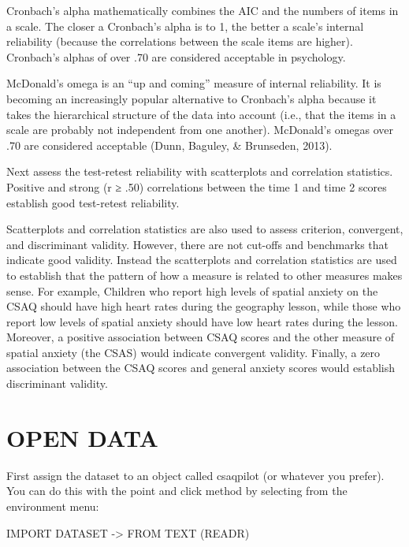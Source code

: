\documentclass[
]{book}
\begin{document}
Cronbach's alpha mathematically combines the AIC and the numbers of items in a scale. The closer a Cronbach's alpha is to 1, the better a scale's internal reliability (because the correlations between the scale items are higher). Cronbach's alphas of over .70 are considered acceptable in psychology.

McDonald's omega is an ``up and coming'' measure of internal reliability. It is becoming an increasingly popular alternative to Cronbach's alpha because it takes the hierarchical structure of the data into account (i.e., that the items in a scale are probably not independent from one another). McDonald's omegas over .70 are considered acceptable (Dunn, Baguley, \& Brunseden, 2013).

Next assess the test-retest reliability with scatterplots and correlation statistics. Positive and strong (r ≥ .50) correlations between the time 1 and time 2 scores establish good test-retest reliability.

Scatterplots and correlation statistics are also used to assess criterion, convergent, and discriminant validity. However, there are not cut-offs and benchmarks that indicate good validity. Instead the scatterplots and correlation statistics are used to establish that the pattern of how a measure is related to other measures makes sense. For example, Children who report high levels of spatial anxiety on the CSAQ should have high heart rates during the geography lesson, while those who report low levels of spatial anxiety should have low heart rates during the lesson. Moreover, a positive association between CSAQ scores and the other measure of spatial anxiety (the CSAS) would indicate convergent validity. Finally, a zero association between the CSAQ scores and general anxiety scores would establish discriminant validity.

\hypertarget{open-data-2}{%
\section{OPEN DATA}\label{open-data-2}}

First assign the dataset to an object called csaqpilot (or whatever you prefer). You can do this with the point and click method by selecting from the environment menu:

IMPORT DATASET -\textgreater{} FROM TEXT (READR)
\end{document}
